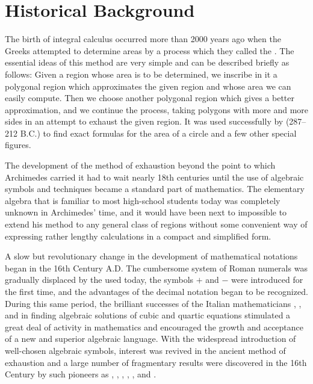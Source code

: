 \section{Historical Background}\label{sec:1.1.2}

\begin{note}
  The birth of integral calculus occurred more than 2000 years ago when the Greeks attempted to determine areas by a process which they called the \textbf{}.
  The essential ideas of this method are very simple and can be described briefly as follows:
  Given a region whose area is to be determined, we inscribe in it a polygonal region which approximates the given region and whose area we can easily compute.
  Then we choose another polygonal region which gives a better approximation, and we continue the process, taking polygons with more and more sides in an attempt to exhaust the given region.
  It was used successfully by  (287--212 B.C.) to find exact formulas for the area of a circle and a few other special figures.

  The development of the method of exhaustion beyond the point to which Archimedes carried it had to wait nearly 18th centuries until the use of algebraic symbols and techniques became a standard part of mathematics.
  The elementary algebra that is familiar to most high-school students today was completely unknown in Archimedes' time, and it would have been next to impossible to extend his method to any general class of regions without some convenient way of expressing rather lengthy calculations in a compact and simplified form.

  A slow but revolutionary change in the development of mathematical notations began in the 16th Century A.D.
  The cumbersome system of Roman numerals was gradually displaced by the  used today, the symbols \(+\) and \(-\) were introduced for the first time, and the advantages of the decimal notation began to be recognized.
  During this same period, the brilliant successes of the Italian mathematicians , , and  in finding algebraic solutions of cubic and quartic equations stimulated a great deal of activity in mathematics and encouraged the growth and acceptance of a new and superior algebraic language.
  With the widespread introduction of well-chosen algebraic symbols, interest was revived in the ancient method of exhaustion and a large number of fragmentary results were discovered in the 16th Century by such pioneers as , , , , , and .


\end{note}
